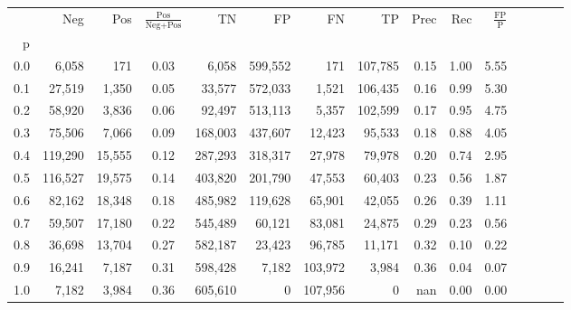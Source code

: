 \begin{tabular}{rrrcrrrrrrrrrrr}
\toprule
{} &      Neg &     Pos & $\frac{\text{Pos}}{\text{Neg}+\text{Pos}}$ &       TN &       FP &       FN &       TP &  Prec &   Rec & $\frac{\text{FP}}{\text{P}}$ \\
p   &          &         &                                            &          &          &          &          &       &       &                              \\
\midrule
0.0 &    6,058 &     171 &                                       0.03 &    6,058 &  599,552 &      171 &  107,785 &  0.15 &  1.00 &                         5.55 \\
0.1 &   27,519 &   1,350 &                                       0.05 &   33,577 &  572,033 &    1,521 &  106,435 &  0.16 &  0.99 &                         5.30 \\
0.2 &   58,920 &   3,836 &                                       0.06 &   92,497 &  513,113 &    5,357 &  102,599 &  0.17 &  0.95 &                         4.75 \\
0.3 &   75,506 &   7,066 &                                       0.09 &  168,003 &  437,607 &   12,423 &   95,533 &  0.18 &  0.88 &                         4.05 \\
0.4 &  119,290 &  15,555 &                                       0.12 &  287,293 &  318,317 &   27,978 &   79,978 &  0.20 &  0.74 &                         2.95 \\
0.5 &  116,527 &  19,575 &                                       0.14 &  403,820 &  201,790 &   47,553 &   60,403 &  0.23 &  0.56 &                         1.87 \\
0.6 &   82,162 &  18,348 &                                       0.18 &  485,982 &  119,628 &   65,901 &   42,055 &  0.26 &  0.39 &                         1.11 \\
0.7 &   59,507 &  17,180 &                                       0.22 &  545,489 &   60,121 &   83,081 &   24,875 &  0.29 &  0.23 &                         0.56 \\
0.8 &   36,698 &  13,704 &                                       0.27 &  582,187 &   23,423 &   96,785 &   11,171 &  0.32 &  0.10 &                         0.22 \\
0.9 &   16,241 &   7,187 &                                       0.31 &  598,428 &    7,182 &  103,972 &    3,984 &  0.36 &  0.04 &                         0.07 \\
1.0 &    7,182 &   3,984 &                                       0.36 &  605,610 &        0 &  107,956 &        0 &   nan &  0.00 &                         0.00 \\
\bottomrule
\end{tabular}
